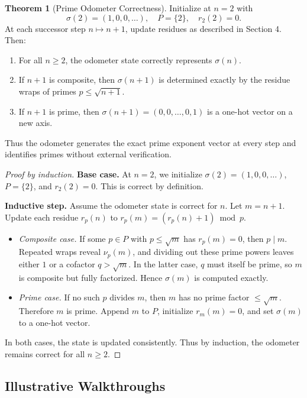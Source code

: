 \documentclass[11pt]{article}
\theoremstyle{definition}
\newtheorem{theorem}{Theorem}[section]
\begin{document}
\begin{theorem}[Prime Odometer Correctness]
Initialize at $n=2$ with
\[
\sigma(2) = (1,0,0,\dots), \quad P=\{2\}, \quad r_2(2)=0.
\]
At each successor step $n \mapsto n+1$, update residues as described in Section 4. 
Then:
\begin{enumerate}
  \item For all $n \geq 2$, the odometer state correctly represents $\sigma(n)$.
  \item If $n+1$ is composite, then $\sigma(n+1)$ is determined exactly by the residue wraps 
        of primes $p \leq \sqrt{n+1}$.
  \item If $n+1$ is prime, then $\sigma(n+1) = (0,0,\dots,0,1)$ is a one-hot vector on a new axis.
\end{enumerate}
Thus the odometer generates the exact prime exponent vector at every step 
and identifies primes without external verification.
\end{theorem}

\begin{proof}[Proof by induction]
\textbf{Base case.}  
At $n=2$, we initialize $\sigma(2)=(1,0,0,\dots)$, $P=\{2\}$, and $r_2(2)=0$.  
This is correct by definition.

\medskip
\noindent
\textbf{Inductive step.}  
Assume the odometer state is correct for $n$.  
Let $m = n+1$.  
Update each residue $r_p(n)$ to $r_p(m) = (r_p(n)+1) \bmod p$. 

\begin{itemize}
  \item \emph{Composite case.}  
        If some $p \in P$ with $p \leq \sqrt{m}$ has $r_p(m)=0$, 
        then $p \mid m$.  
        Repeated wraps reveal $\nu_p(m)$, and dividing out these prime powers 
        leaves either $1$ or a cofactor $q > \sqrt{m}$.  
        In the latter case, $q$ must itself be prime, so $m$ is composite but fully factorized.  
        Hence $\sigma(m)$ is computed exactly.
  \item \emph{Prime case.}  
        If no such $p$ divides $m$, then $m$ has no prime factor $\leq \sqrt{m}$.  
        Therefore $m$ is prime.  
        Append $m$ to $P$, initialize $r_m(m)=0$, and set $\sigma(m)$ to a one-hot vector.
\end{itemize}

In both cases, the state is updated consistently.  
Thus by induction, the odometer remains correct for all $n \geq 2$.
\end{proof}

\subsection{Illustrative Walkthroughs}
\end{document}
